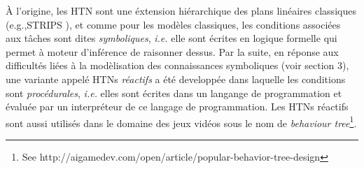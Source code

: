 \documentclass[a4paper,twoside,french]{article}
\begin{document}
				\`A l'origine, les HTN sont une \'extension hi\'erarchique des plans lin\'eaires classiques (e.g.,STRIPS \cite{fikes1972strips}), et comme pour les modèles classiques, les conditions associ\'ees aux t\^aches sont dites \textit{symboliques}, \emph{i.e.} elle sont \'ecrites en logique formelle qui permet à moteur d'inf\'erence de raisonner dessus. Par la suite, en r\'eponse aux difficult\'es li\'ees \`a la mod\`elisation des connaissances symboliques (voir section 3), une variante appel\'e HTNs \textit{réactifs} a \'et\'e developp\'ee dans laquelle les conditions sont \textit{proc\'edurales}, \emph{i.e.} elles sont \'ecrites dans un langange de programmation et \'evalu\'ee par un interpr\'eteur de ce langage de programmation. Les HTNs réactifs sont aussi utilis\'es dans le domaine des jeux vid\'eos sous le nom de \emph{behaviour tree}\footnote{See http://aigamedev.com/open/article/popular-behavior-tree-design}.
				
\end{document}
